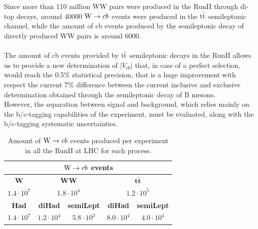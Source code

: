 \\
\\
Since more than 110 million WW pairs were produced in the RunII through di-top decays, around 40000 ${\text{W}} \to cb$ events were produced in the ${{\text{t}}{\bar{\text{t}}}}$ semileptonic channel, while the amount of cb events produced by the semileptonic decay of directly produced WW pairs is around 6000.\\
\\
The amount of cb events provided by ${{\text{t}}{\bar{\text{t}}}}$ semileptonic decays in the RunII allows us to provide a new determination of $|V_{cb}|$ that, in case of a perfect selection, would reach the 0.5\% statistical precision, that is a huge improvement with respect the current 7\% difference between the current inclusive and exclusive determination obtained through the semileptonic decay of B mesons.\\
However, the separation between signal and background, which relies mainly on the b/c-tagging capabilities of the experiment, must be evaluated, along with the b/c-tagging systematic uncertainties.

\begin{table}[H]
    \centering
    \begin{tabular}{c|c|c|c|c}
        \toprule
        \multicolumn{5}{c}{${\text{W}} \to cb$ events}\\
        \midrule
        \midrule
        \textbf{W} &  \multicolumn{2}{c|}{\textbf{WW}} & \multicolumn{2}{c}{$\bm{t\bar{t}}$} \\
        \midrule
          $1.4 \cdot 10^7$&  \multicolumn{2}{c|}{$1.8 \cdot 10^4$}  &  \multicolumn{2}{c}{$1.2 \cdot 10^5$} \\
        \midrule
        \textbf{Had} & \textbf{diHad} & \textbf{semiLept} & \textbf{diHad} & \textbf{semiLept}\\
        \midrule
         $1.4 \cdot 10^7$ & $1.2\cdot 10^4$ & $5.8 \cdot 10^3$ & $8.0 \cdot 10^4$ & $4.0\cdot 10^4$ \\
         \bottomrule

    \end{tabular}
    \caption{Amount of ${\text{W}} \to cb$ events produced per experiment in all the RunII at LHC for each process.}
    \label{tab:my_label}
\end{table}